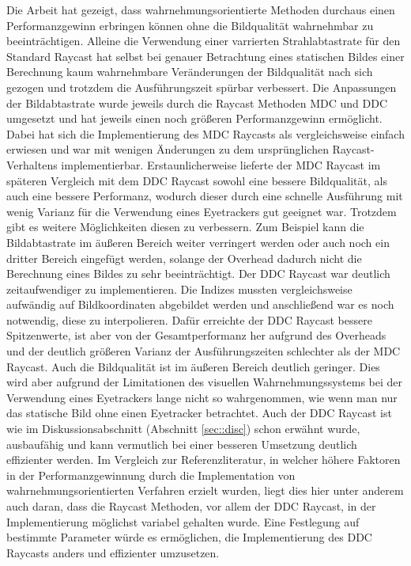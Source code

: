 Die Arbeit hat gezeigt, dass wahrnehmungsorientierte Methoden durchaus einen Performanzgewinn erbringen können ohne die Bildqualität wahrnehmbar zu beeinträchtigen.
Alleine die Verwendung einer varrierten Strahlabtastrate für den Standard Raycast hat selbst bei genauer Betrachtung eines statischen Bildes einer Berechnung kaum wahrnehmbare Veränderungen der Bildqualität nach sich gezogen und trotzdem die Ausführungszeit spürbar verbessert.
Die Anpassungen der Bildabtastrate wurde jeweils durch die Raycast Methoden MDC und DDC umgesetzt und hat jeweils einen noch größeren Performanzgewinn ermöglicht.
Dabei hat sich die Implementierung des MDC Raycasts als vergleichsweise einfach erwiesen und war mit wenigen Änderungen zu dem ursprünglichen Raycast-Verhaltens implementierbar.
Erstaunlicherweise lieferte der MDC Raycast im späteren Vergleich mit dem DDC Raycast sowohl eine bessere Bildqualität, als auch eine bessere Performanz, wodurch dieser durch eine schnelle Ausführung mit wenig Varianz für die Verwendung eines Eyetrackers gut geeignet war.
Trotzdem gibt es weitere Möglichkeiten diesen zu verbessern. 
Zum Beispiel kann die Bildabtastrate im äußeren Bereich weiter verringert werden oder auch noch ein dritter Bereich eingefügt werden, solange der Overhead dadurch nicht die Berechnung eines Bildes zu sehr beeinträchtigt.
Der DDC Raycast war deutlich zeitaufwendiger zu implementieren.
Die Indizes mussten vergleichsweise aufwändig auf Bildkoordinaten abgebildet werden und anschließend war es noch notwendig, diese zu interpolieren.
Dafür erreichte der DDC Raycast bessere Spitzenwerte, ist aber von der Gesamtperformanz her aufgrund des Overheads und der deutlich größeren Varianz der Ausführungszeiten schlechter als der MDC Raycast.
Auch die Bildqualität ist im äußeren Bereich deutlich geringer.
Dies wird aber aufgrund der Limitationen des visuellen Wahrnehmungssystems bei der Verwendung eines Eyetrackers lange nicht so wahrgenommen, wie wenn man nur das statische Bild ohne einen Eyetracker betrachtet.
Auch der DDC Raycast ist wie im Diskussionsabschnitt (Abschnitt \ref{sec::disc}) schon erwähnt wurde, ausbaufähig und kann vermutlich bei einer besseren Umsetzung deutlich effizienter werden.
Im Vergleich zur Referenzliteratur, in welcher höhere Faktoren in der Performanzgewinnung durch die Implementation von wahrnehmungsorientierten Verfahren erzielt wurden, liegt dies hier unter anderem auch daran, dass die Raycast Methoden, vor allem der DDC Raycast, in der Implementierung möglichst variabel gehalten wurde.
Eine Festlegung auf bestimmte Parameter würde es ermöglichen, die Implementierung des DDC Raycasts anders und effizienter umzusetzen.

